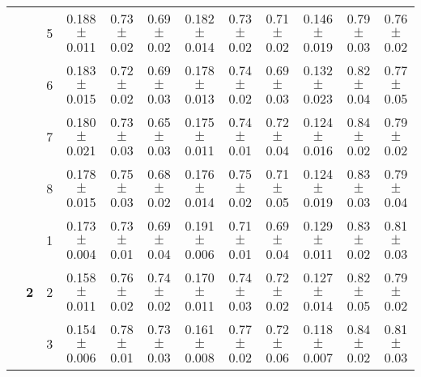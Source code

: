 \begin{table*}
{\begin{tabular}{|l|c|c||c|c|c||c|c|c||c|c|c|}
 & & 5 & \textcolor{gate_color}{0.188$\pm$0.011} & \textcolor{gate_color}{0.73$\pm$0.02} & \textcolor{gate_color}{0.69$\pm$0.02} & \textcolor{mixed_color}{0.182$\pm$0.014} & \textcolor{mixed_color}{0.73$\pm$0.02} & \textcolor{mixed_color}{0.71$\pm$0.02} & \textcolor{pulsed_color}{0.146$\pm$0.019} & \textcolor{pulsed_color}{0.79$\pm$0.03} & \textcolor{pulsed_color}{0.76$\pm$0.02} \\
 & & 6 & \textcolor{gate_color}{0.183$\pm$0.015} & \textcolor{gate_color}{0.72$\pm$0.02} & \textcolor{gate_color}{0.69$\pm$0.03} & \textcolor{mixed_color}{0.178$\pm$0.013} & \textcolor{mixed_color}{0.74$\pm$0.02} & \textcolor{mixed_color}{0.69$\pm$0.03} & \textcolor{pulsed_color}{0.132$\pm$0.023} & \textcolor{pulsed_color}{0.82$\pm$0.04} & \textcolor{pulsed_color}{0.77$\pm$0.05} \\
 & & 7 & \textcolor{gate_color}{0.180$\pm$0.021} & \textcolor{gate_color}{0.73$\pm$0.03} & \textcolor{gate_color}{0.65$\pm$0.03} & \textcolor{mixed_color}{0.175$\pm$0.011} & \textcolor{mixed_color}{0.74$\pm$0.01} & \textcolor{mixed_color}{0.72$\pm$0.04} & \textcolor{pulsed_color}{0.124$\pm$0.016} & \textcolor{pulsed_color}{0.84$\pm$0.02} & \textcolor{pulsed_color}{0.79$\pm$0.02} \\
 & & 8 & \textcolor{gate_color}{0.178$\pm$0.015} & \textcolor{gate_color}{0.75$\pm$0.03} & \textcolor{gate_color}{0.68$\pm$0.02} & \textcolor{mixed_color}{0.176$\pm$0.014} & \textcolor{mixed_color}{0.75$\pm$0.02} & \textcolor{mixed_color}{0.71$\pm$0.05} & \textcolor{pulsed_color}{0.124$\pm$0.019} & \textcolor{pulsed_color}{0.83$\pm$0.03} & \textcolor{pulsed_color}{0.79$\pm$0.04} \\
\cline{2-12}
 & \multirow{8}{*}{\textbf{2}} & 1 & \textcolor{gate_color}{0.173$\pm$0.004} & \textcolor{gate_color}{0.73$\pm$0.01} & \textcolor{gate_color}{0.69$\pm$0.04} & \textcolor{mixed_color}{0.191$\pm$0.006} & \textcolor{mixed_color}{0.71$\pm$0.01} & \textcolor{mixed_color}{0.69$\pm$0.04} & \textcolor{pulsed_color}{0.129$\pm$0.011} & \textcolor{pulsed_color}{0.83$\pm$0.02} & \textcolor{pulsed_color}{0.81$\pm$0.03} \\
 & & 2 & \textcolor{gate_color}{0.158$\pm$0.011} & \textcolor{gate_color}{0.76$\pm$0.02} & \textcolor{gate_color}{0.74$\pm$0.02} & \textcolor{mixed_color}{0.170$\pm$0.011} & \textcolor{mixed_color}{0.74$\pm$0.03} & \textcolor{mixed_color}{0.72$\pm$0.02} & \textcolor{pulsed_color}{0.127$\pm$0.014} & \textcolor{pulsed_color}{0.82$\pm$0.05} & \textcolor{pulsed_color}{0.79$\pm$0.02} \\
 & & 3 & \textcolor{gate_color}{0.154$\pm$0.006} & \textcolor{gate_color}{0.78$\pm$0.01} & \textcolor{gate_color}{0.73$\pm$0.03} & \textcolor{mixed_color}{0.161$\pm$0.008} & \textcolor{mixed_color}{0.77$\pm$0.02} & \textcolor{mixed_color}{0.72$\pm$0.06} & \textcolor{pulsed_color}{0.118$\pm$0.007} & \textcolor{pulsed_color}{0.84$\pm$0.02} & \textcolor{pulsed_color}{0.81$\pm$0.03} \\

\end{tabular}}
\end{table*}
